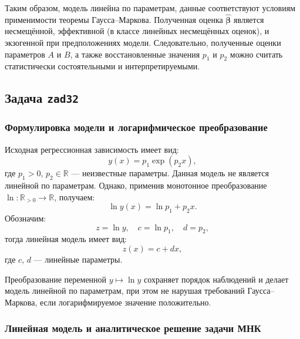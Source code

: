 \begin{answer}
    Таким образом, модель линейна по параметрам, данные соответствуют условиям применимости теоремы Гаусса–Маркова. Полученная оценка $\hat{\boldsymbol{\beta}}$ является несмещённой, эффективной (в классе линейных несмещённых оценок), и экзогенной при предположениях модели. Следовательно, полученные оценки параметров $A$ и $B$, а также восстановленные значения $p_1$ и $p_2$ можно считать статистически состоятельными и интерпретируемыми.
\end{answer}

\subsection{Задача \texttt{zad32}}

\subsubsection{Формулировка модели и логарифмическое преобразование}

Исходная регрессионная зависимость имеет вид:
\begin{equation}
    y(x) = p_1 \exp(p_2 x),
\end{equation}
где $p_1 > 0$, $p_2 \in \mathbb{R}$ — неизвестные параметры. Данная модель не является линейной по параметрам. Однако, применив монотонное преобразование $\ln : \mathbb{R}_{>0} \to \mathbb{R}$, получаем:
\begin{equation}
    \ln y(x) = \ln p_1 + p_2 x.
\end{equation}
Обозначим:
\[
z = \ln y, \quad c = \ln p_1, \quad d = p_2,
\]
тогда линейная модель имеет вид:
\begin{equation}
    z(x) = c + d x,
\end{equation}
где $c$, $d$ — линейные параметры.

\begin{remark}
Преобразование переменной $y \mapsto \ln y$ сохраняет порядок наблюдений и делает модель линейной по параметрам, при этом не нарушая требований Гаусса–Маркова, если логарифмируемое значение положительно.
\end{remark}

\subsubsection{Линейная модель и аналитическое решение задачи МНК}

